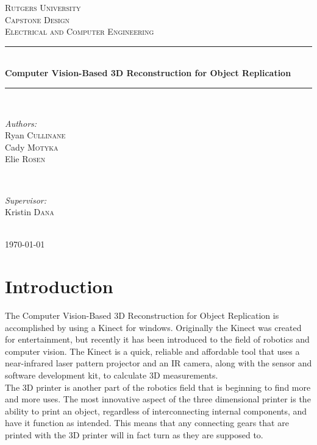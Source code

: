 \documentclass[12pt,twocolumn]{article}
\begin{document}
\begin{titlepage}
\newcommand{\HRule}{\rule{\linewidth}{0.5mm}}
\center
\textsc{\LARGE Rutgers University}\\[1.5cm] 
\textsc{\Large Capstone Design}\\[0.5cm] 
\textsc{\large Electrical and Computer Engineering}\\[0.5cm]
\HRule \\[0.4cm]
{ \huge \bfseries Computer Vision-Based 3D Reconstruction for Object Replication}\\[0.4cm] 
\HRule \\[1.5cm]
\begin{minipage}{0.4\textwidth}
\begin{flushleft} \large
\emph{Authors:}\\
Ryan \textsc{Cullinane}\\
Cady \textsc{Motyka}\\
Elie \textsc{Rosen}
\end{flushleft}
\end{minipage}
~
\begin{minipage}{0.4\textwidth}
\begin{flushright} \large
\emph{Supervisor:} \\
Kristin \textsc{Dana} 
\end{flushright}
\end{minipage}\\[4cm]
{\large \today}\\[3cm]
\vfill 
\end{titlepage}

\section{Introduction}
The Computer Vision-Based 3D Reconstruction for Object Replication is accomplished by using a Kinect for windows. Originally the Kinect was created for entertainment, but recently it has been introduced to the field of robotics and computer vision. The Kinect is a quick, reliable and affordable tool that uses a near-infrared laser pattern projector and an IR camera, along with the sensor and software development kit, to calculate 3D measurements.  \\
\indent The 3D printer is another part of the robotics field that is beginning to find more and more uses. The most innovative aspect of the three dimensional printer is the ability to print an object, regardless of interconnecting internal components, and have it function as intended. This means that any connecting gears that are printed with the 3D printer will in fact turn as they are supposed to. \\
\end{document}
